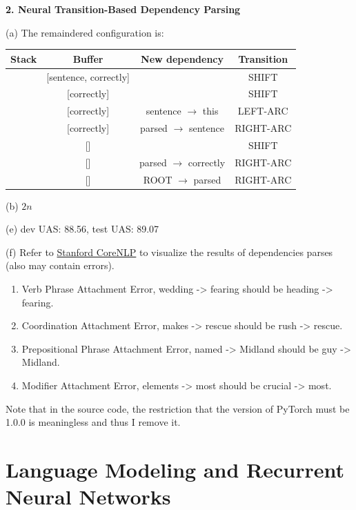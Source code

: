 \textbf{2. Neural Transition-Based Dependency Parsing}

(a) The remaindered configuration is:
\begin{table}
	\begin{center}
		\begin{tabular}{c|c|c|c}
			Stack & Buffer & New dependency & Transition \\
			\hline
			[ROOT, parsed, this] & [sentence, correctly] & & \textsf{SHIFT} \\ \hline
			[ROOT, parsed, this, sentence] & [correctly] & & \textsf{SHIFT} \\ \hline
			[ROOT, parsed, sentence] & [correctly] & sentence $\rightarrow$ this & \textsf{LEFT-ARC} \\ \hline
			[ROOT, parsed] & [correctly] & parsed $\rightarrow$ sentence & \textsf{RIGHT-ARC} \\ \hline
			[ROOT, parsed, correctly] & [] & & \textsf{SHIFT} \\ \hline
			[ROOT, parsed] & [] & parsed $\rightarrow$ correctly & \textsf{RIGHT-ARC} \\ \hline
			[ROOT] & [] & ROOT $\rightarrow$ parsed & \textsf{RIGHT-ARC}
		\end{tabular}
	\end{center}
\end{table}

(b) $2n$

(e) dev UAS: 88.56, test UAS: 89.07

(f) Refer to \href{https://corenlp.run/}{Stanford CoreNLP} to visualize the results of dependencies parses (also may contain errors).
\begin{enumerate}[label=(\roman*)]
	\item Verb Phrase Attachment Error, wedding -> fearing should be heading -> fearing.
	\item Coordination Attachment Error, makes -> rescue should be rush -> rescue.
	\item Prepositional Phrase Attachment Error, named -> Midland should be guy -> Midland.
	\item Modifier Attachment Error, elements -> most should be crucial -> most.
\end{enumerate}

Note that in the source code, the restriction that the version of PyTorch must be 1.0.0 is meaningless and thus I remove it.

\section{Language Modeling and Recurrent Neural Networks}

